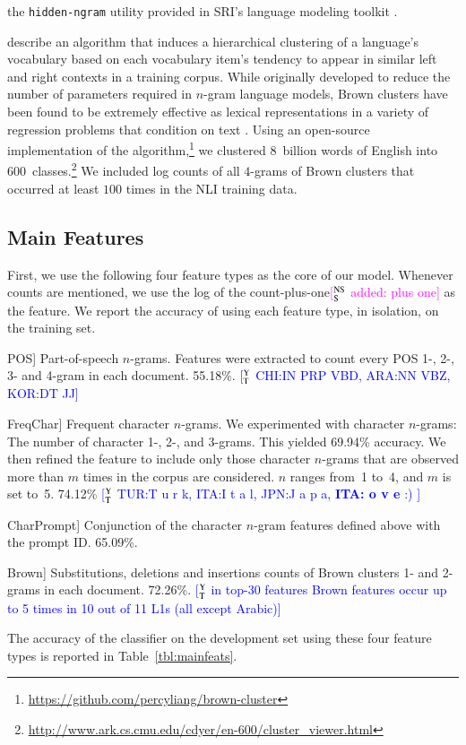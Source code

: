 \documentclass[11pt,letterpaper]{article}
\newcommand{\ensuretext}[1]{#1}
\newcommand{\nssmarker}{\ensuretext{\textcolor{magenta}{\ensuremath{^{\textsc{NS}}_{\textsc{S}}}}}}
\newcommand{\ytmarker}{\ensuretext{\textcolor{blue}{\ensuremath{^{\textsc{Y}}_{\textsc{T}}}}}}
\newcommand{\arkcomment}[3]{\ensuretext{\textcolor{#3}{[#1 #2]}}}
\newcommand{\nss}[1]{\arkcomment{\nssmarker}{#1}{magenta}}
\newcommand{\yt}[1]{\arkcomment{\ytmarker}{#1}{blue}}
\newcommand{\Tref}[1]{Table~\ref{#1}}
\newcommand{\feat}[1]{\textsmaller[.5]{\textsf{#1}}} %
\begin{document}
\begin{compactdesc}
  the \texttt{hidden-ngram} utility provided in SRI's language modeling toolkit
  \citep{stolcke02srilm}.
\item[Brown clusters] \cite{brown:cl1992} describe an algorithm that induces a hierarchical clustering of a language's vocabulary based on each vocabulary item's tendency to appear in similar left and right contexts in a training corpus. While originally developed to reduce the number of parameters required in $n$-gram language models, Brown clusters have been found to be extremely effective as lexical representations in a variety of regression problems that condition on text \citep{koo:2008,turian:acl2010,owoputi:2013}.  Using an open-source implementation of the algorithm,\footnote{\url{https://github.com/percyliang/brown-cluster}} we clustered 8~billion words of English into 600~classes.\footnote{\url{http://www.ark.cs.cmu.edu/cdyer/en-600/cluster_viewer.html}}  We included log counts of all $4$-grams of Brown clusters that occurred at least $100$ times in the NLI training data.

\end{compactdesc}

\subsection{Main Features}
\label{sec:mainfeats}
First, we use the following four feature types as the core of our
model.  Whenever counts are mentioned, we use the log of the count-plus-one\nss{added: plus one} as
the feature.  We report the accuracy of using each feature type, in
isolation, on the training set.


\begin{compactdesc}
\item[\feat{POS}] Part-of-speech $n$-grams.  Features were extracted
  to count every POS 1-, 2-, 3- and 4-gram in each
  document. 55.18\%. \yt{CHI:IN PRP VBD, ARA:NN VBZ, KOR:DT JJ} 
\item[\feat{FreqChar}] Frequent character $n$-grams.  We experimented
  with character $n$-grams: The number of character 1-, 2-, and
  3-grams. This yielded 69.94\% accuracy.  We then refined the feature
  to include only those character $n$-grams that are observed more
  than $m$ times in the corpus are considered. $n$ ranges from~1
    to~4, and $m$ is set to~5. 74.12\% \yt{TUR:T u r k, ITA:I t a l, JPN:J a p a, \textbf{ITA: o v e} :) }  
\item[\feat{CharPrompt}] Conjunction of the character $n$-gram
  features defined above with the prompt ID. 65.09\%.
\item[\feat{Brown}] Substitutions, deletions and insertions counts of Brown clusters 1- and 2-grams in each document. 72.26\%. \yt{in top-30 features Brown features occur up to 5 times in 10 out of 11 L1s (all except Arabic)} 
\end{compactdesc}
\noindent
The accuracy of the classifier on the development set using these four
feature types is reported in \Tref{tbl:mainfeats}.
\end{document}
